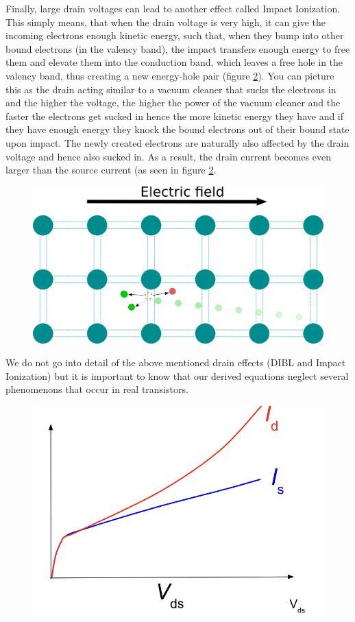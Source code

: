 Finally, large drain voltages can lead to another effect called Impact Ionization. This simply means, that when the drain voltage is very high, it can give the incoming electrons enough kinetic energy, such that, when they bump into other bound electrons (in the valency band), the impact transfers enough energy to free them and elevate them into the conduction band, which leaves a free hole in the valency band, thus creating a new energy-hole pair (figure \ref{fig:impactIonisation2}). You can picture this as the drain acting similar to a vacuum cleaner that sucks the electrons in and the higher the voltage, the higher the power of the vacuum cleaner and the faster the electrons get sucked in hence the more kinetic energy they have and if they have enough energy they knock the bound electrons out of their bound state upon impact. The newly created electrons are naturally also affected by the drain voltage and hence also sucked in. As a result, the drain current becomes even larger than the source current (as seen in figure \ref{fig:impactIonisation2}.\\

\begin{figure}[H]
    \centering
    \includegraphics[width=0.65\linewidth]{../../Figures/ImpactIonisation1.png}
    \caption{}
    \label{fig:impactIonisation}
\end{figure}

We do not go into detail of the above mentioned drain effects (DIBL and Impact Ionization) but it is important to know that our derived equations neglect several phenomenons that occur in real transistors.\\

\begin{figure}[H]
    \centering
    \includegraphics[width=0.65\linewidth]{../../Figures/ImpactIonisation2.png}
    \caption{}
    \label{fig:impactIonisation2}
\end{figure}